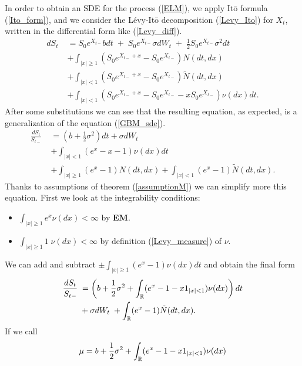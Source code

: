 In order to obtain an SDE for the process (\ref{ELM}), we apply It\={o} formula (\ref{Ito_form}), and we consider 
the Lévy-It\={o} decomposition (\ref{Levy_Ito}) for $X_t$, written in the differential form like (\ref{Levy_diff}).
\begin{align*}
 d S_t \; &= S_0 e^{X_{t-}} b dt \; + \; S_0 e^{X_{t-}} \sigma dW_t \; + \; \frac{1}{2}S_0 e^{X_{t-}}\sigma^2 dt \\ \nonumber
          &+ \int_{|x|\geq 1} (S_0 e^{X_{t-}+x} - S_0 e^{X_{t-}}) N(dt,dx) \\ \nonumber
          &+ \int_{|x|< 1} (S_0 e^{X_{t-}+x} - S_0 e^{X_{t-}}) \tilde N(dt,dx) \\  \nonumber
          &+ \int_{|x|< 1} (S_0 e^{X_{t-}+x} - S_0 e^{X_{t-}} - x S_0 e^{X_{t-}}) \nu(dx) dt. \nonumber
\end{align*}
After some substitutions we can see that the resulting equation, as expected, is a generalization of the equation (\ref{GBM_sde}).
\begin{align}
 \frac{d S_t}{S_{t-}}  \; &= (b + \frac{1}{2}\sigma^2 ) dt + \sigma dW_t \\ \nonumber
                          &+ \int_{|x|< 1} ( e^{x} - x - 1) \nu(dx) dt \\ \nonumber
                          &+ \int_{|x|\geq 1} (e^{x} - 1) N(dt,dx) + \int_{|x|< 1} (e^{x} - 1) \tilde N(dt,dx). \nonumber
\end{align}
Thanks to assumptions of theorem (\ref{assumptionM}) we can simplify more this equation.
First we look at the integrability conditions:
\begin{itemize}
 \item $\int_{|x|\geq 1}  e^{x} \nu(dx) < \infty$ by \textbf{EM}.  
 \item $\int_{|x|\geq 1} 1\; \nu(dx) < \infty$ by definition (\ref{Levy_measure}) of $\nu$.
\end{itemize}
We can add and subtract $\pm \int_{|x|\geq 1} ( e^{x} - 1) \nu(dx) dt $ and obtain the final form
\begin{align} \label{exp_sde}
 \frac{d S_t}{S_{t-}}  \; &= \left(b + \frac{1}{2}\sigma^2 + \int_{\mathbb{R}} ( e^{x} - 1 -x1_{|x|<1}) \nu(dx) \right) dt  \\ \nonumber
                          &+  \sigma dW_t \; + \int_{\mathbb{R}} (e^{x} - 1) \tilde N(dt,dx). \nonumber
\end{align}
If we call
\begin{equation}\label{mu}
 \mu = b + \frac{1}{2}\sigma^2 + \int_{\mathbb{R}} ( e^{x} - 1 -x1_{|x|<1}) \nu(dx)
\end{equation}

